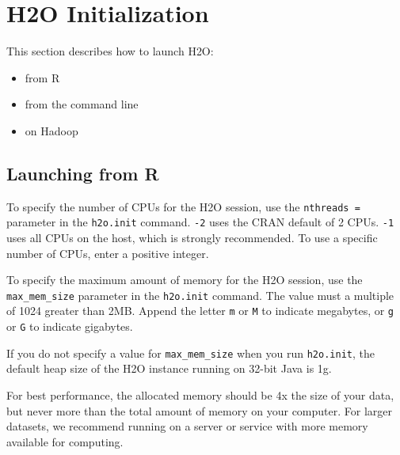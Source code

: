{{%

\section{H2O Initialization}

This section describes how to launch H2O: 
\begin{itemize}
\item from R
\item from the command line
\item on Hadoop
\end{itemize}

\subsection{Launching from R} \label{ssec:LaunchR}

To specify the number of CPUs for the H2O session, use the \texttt{nthreads = } parameter in the \texttt{h2o.init} command. \texttt{-2} uses the CRAN default of 2 CPUs. \texttt{-1} uses 
all CPUs on the host, which is strongly recommended. To use a specific number of CPUs, enter a positive integer.

To specify the maximum amount of memory for the H2O session, use the {\texttt{max\_mem\_size}} parameter in the \texttt{h2o.init} command. The value must a multiple of 1024 greater than 2MB. Append the letter \texttt{m} or \texttt{M} to indicate megabytes, or \texttt{g} or \texttt{G} to indicate gigabytes. 

If you do not specify a value for {\texttt{max\_mem\_size}} when you run {\texttt{h2o.init}}, the default heap size of the H2O instance running on 32-bit Java is 1g. 

For best performance, the allocated memory should be 4x the size of your data, but never more than the total amount of memory on your computer. For larger datasets, we recommend running on a server or service with more memory available for computing.

}}
